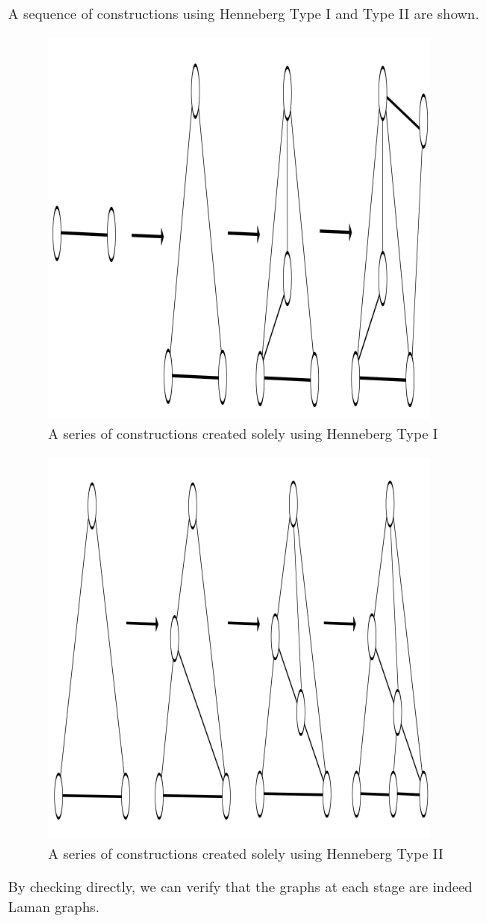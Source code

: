 \begin{example}
A sequence of constructions using Henneberg Type I and Type II are shown.

\begin{figure}[htbp]
    \centering
    \includegraphics[width = 0.9\textwidth]{Chapter 3/2. henneberg_1.png}
    \caption{A series of constructions created solely using Henneberg Type I}
    \label{fig: henneberg 1}
\end{figure}

\begin{figure}[htbp]
    \centering
    \includegraphics[width = 0.9\textwidth]{Chapter 3/3. henneberg_2.png}
    \caption{A series of constructions created solely using Henneberg Type II}
    \label{fig: henneberg 2}
\end{figure}
\noindent
By checking directly, we can verify that the graphs at each stage are indeed Laman graphs.
\end{example}

